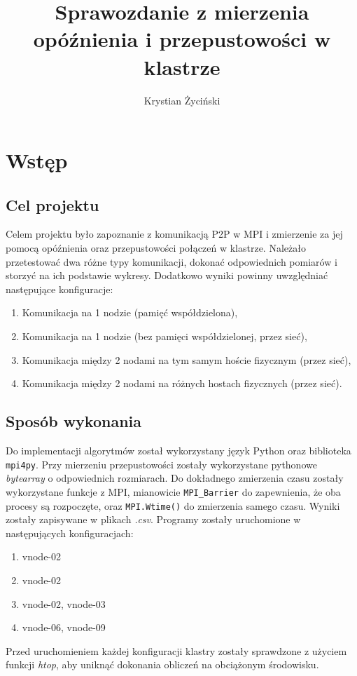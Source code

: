 \documentclass[11pt]{article}
\author{Krystian \.Zyci\'nski}
\title{Sprawozdanie z mierzenia opóźnienia i przepustowości w klastrze}
\date{\the\year}
\begin{document}
    \maketitle
    \clearpage
    \section{Wstęp}\label{sec:1}
    \subsection{Cel projektu}
    Celem projektu było zapoznanie z komunikacją P2P w MPI i zmierzenie za jej pomocą opóźnienia oraz
    przepustowości połączeń w klastrze.
    Należało przetestować dwa różne typy komunikacji, dokonać odpowiednich
    pomiarów i storzyć na ich podstawie wykresy.
    Dodatkowo wyniki powinny uwzględniać następujące konfiguracje:
    \begin{enumerate}
        \item Komunikacja na 1 nodzie (pamięć współdzielona),
        \item Komunikacja na 1 nodzie (bez pamięci współdzielonej, przez sieć),
        \item Komunikacja między 2 nodami na tym samym hoście fizycznym (przez sieć),
        \item Komunikacja między 2 nodami na różnych hostach fizycznych (przez sieć).
    \end{enumerate}
    \subsection{Sposób wykonania}
    Do implementacji algorytmów został wykorzystany język Python oraz biblioteka \texttt{mpi4py}.
    Przy mierzeniu przepustowości zostały wykorzystane pythonowe \textit{bytearray} o odpowiednich rozmiarach.
    Do dokładnego zmierzenia czasu zostały wykorzystane funkcje z MPI, mianowicie \texttt{MPI\_Barrier} do
    zapewnienia, że oba procesy są rozpoczęte, oraz \texttt{MPI.Wtime()} do zmierzenia samego czasu.
    Wyniki zostały zapisywane w plikach \textit{.csv}.
    Programy zostały uruchomione w następujących konfiguracjach:
    \begin{enumerate}
        \item vnode-02
        \item vnode-02
        \item vnode-02, vnode-03
        \item vnode-06, vnode-09
    \end{enumerate}
    Przed uruchomieniem każdej konfiguracji klastry zostały sprawdzone z użyciem funkcji \textit{htop}, aby
    uniknąć dokonania obliczeń na obciążonym środowisku.
\end{document}
